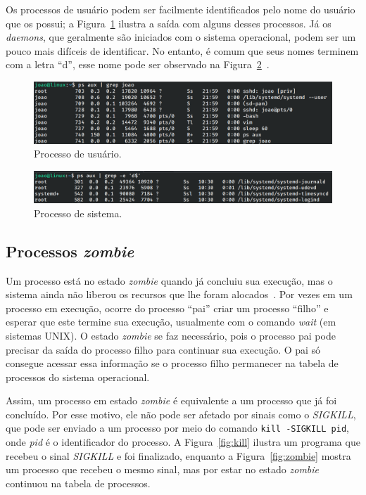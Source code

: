 \documentclass[
	12pt,				%
	oneside,   	        %
	a4paper,			%
	english,			%
	french,				%
	spanish,			%
	brazil,				%
	]{pacotes/abntex2}
\begin{document}
Os processos de usuário podem ser facilmente identificados pelo nome do usuário que os possui; a Figura~\ref{fig:user} ilustra a saída com alguns desses processos. Já os \textit{daemons}, que geralmente são iniciados com o sistema operacional, podem ser um pouco mais difíceis de identificar. No entanto, é comum que seus nomes terminem com a letra ``d'', esse nome pode ser observado na Figura~\ref{fig:daemon}~\cite{negus2012}.

\begin{figure}[H]
  \centering
  \includegraphics[scale=0.45]{figuras/user.png}
  \caption{Processo de usuário.}
  \label{fig:user}
\end{figure}

\begin{figure}[H]
  \centering
  \includegraphics[scale=0.45]{figuras/daemons.png}
  \caption{Processo de sistema.}
  \label{fig:daemon}
\end{figure}

\subsection{Processos \textit{zombie}}
\label{subsec:zombie}

Um processo está no estado \textit{zombie} quando já concluiu sua execução, mas o sistema ainda não liberou os recursos que lhe foram alocados~\cite{stallings2018}. Por vezes em um processo em execução, ocorre do processo ``pai'' criar um processo ``filho'' e esperar que este termine sua execução, usualmente com o comando \textit{wait} (em sistemas UNIX). O estado \textit{zombie} se faz necessário, pois o processo pai pode precisar da saída do processo filho para continuar sua execução. O pai só consegue acessar essa informação se o processo filho permanecer na tabela de processos do sistema operacional.

Assim, um processo em estado \textit{zombie} é equivalente a um processo que já foi concluído. Por esse motivo, ele não pode ser afetado por sinais como o \textit{SIGKILL}, que pode ser enviado a um processo por meio do comando \texttt{kill -SIGKILL pid}, onde \textit{pid} é o identificador do processo. A Figura~\ref{fig:kill} ilustra um programa que recebeu o sinal \textit{SIGKILL} e foi finalizado, enquanto a Figura~\ref{fig:zombie} mostra um processo que recebeu o mesmo sinal, mas por estar no estado \textit{zombie} continuou na tabela de processos.
\end{document}
